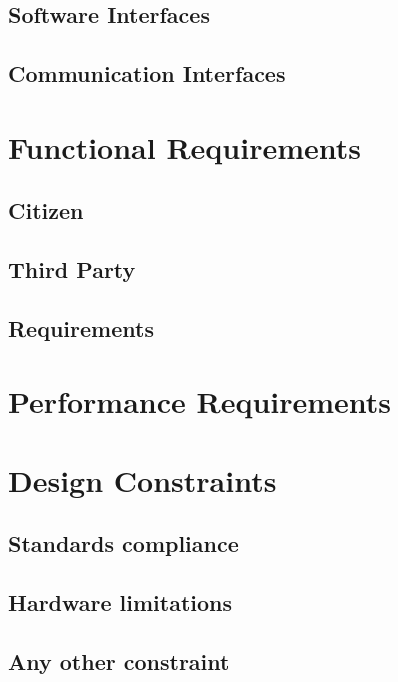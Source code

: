         \subsection{Software Interfaces}
        	
        \subsection{Communication Interfaces}
        	
    \section{Functional Requirements}
        \subsection{Citizen}
            
        \newpage
        \subsection{Third Party}
            
        \subsection{Requirements}
        	
    \section{Performance Requirements}
    	
    \section{Design Constraints}
        \subsection{Standards compliance}
        	
        \subsection{Hardware limitations}
        	
        \subsection{Any other constraint}
        	

